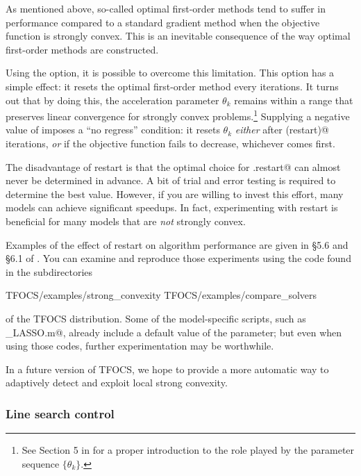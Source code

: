 \documentclass{article}
\begin{document}
As mentioned above, so-called optimal first-order methods tend to suffer
in performance compared to a standard gradient method when the objective
function is strongly convex. This is an inevitable consequence of the
way optimal first-order methods are constructed.

Using the \verb@restart@ option, it is possible to overcome this
limitation. This option has a simple effect: it resets the optimal
first-order method every \verb@restart@ iterations. It turns out that
by doing this, the acceleration parameter $\theta_k$ remains within a
range that preserves linear convergence for strongly convex
problems.\footnote{See Section 5 in \cite{TFOCS} for a proper introduction to
the role played by the parameter sequence $\{\theta_k\}$.} Supplying a negative
value of \verb@restart@ imposes a ``no regress'' condition: it resets
$\theta_k$ \emph{either} after \verb@abs(restart)@ iterations,
\emph{or} if the objective function fails to decrease, whichever comes
first.

The disadvantage of restart is that the optimal choice for
\verb@opts.restart@ can almost never be determined in advance.
A bit of trial and error testing
is required to determine the best value.
However, if you are willing to invest this effort, many models
can achieve significant speedups. In fact, experimenting with
restart is beneficial for many models that are \emph{not}
strongly convex.

Examples of 
the effect of restart on algorithm performance are given in \S5.6 and 
\S6.1 of \cite{TFOCS}. You can examine and reproduce those
experiments using the code found in the subdirectories
\begin{code}
	TFOCS/examples/strong_convexity
	TFOCS/examples/compare_solvers
\end{code}
of the TFOCS distribution. Some of the model-specific scripts,
such as \verb@solver_LASSO.m@, already include a default value 
of the \verb@restart@ parameter; but even when using those codes,
further experimentation may be worthwhile.

In a future version of TFOCS, we hope to provide a more automatic
way to adaptively detect and exploit local strong convexity.

\subsubsection{Line search control}
\end{document}
